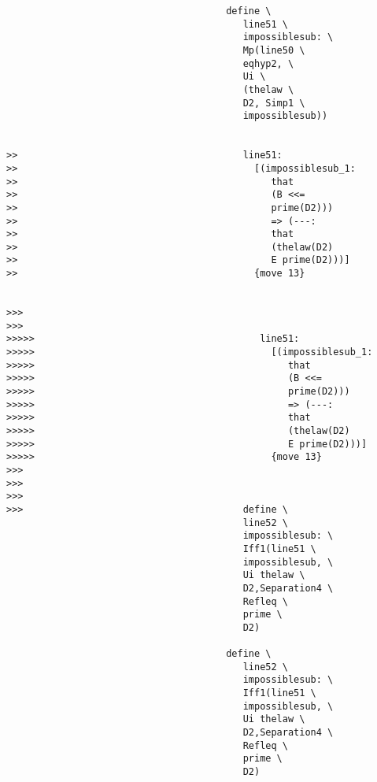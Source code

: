 \documentclass[12pt]{article}
\begin{document}
\begin{verbatim}
                                       define \
                                          line51 \
                                          impossiblesub: \
                                          Mp(line50 \
                                          eqhyp2, \
                                          Ui \
                                          (thelaw \
                                          D2, Simp1 \
                                          impossiblesub))


>>                                        line51:
>>                                          [(impossiblesub_1:
>>                                             that
>>                                             (B <<=
>>                                             prime(D2)))
>>                                             => (---:
>>                                             that
>>                                             (thelaw(D2)
>>                                             E prime(D2)))]
>>                                          {move 13}


>>>
>>>
>>>>>                                        line51:
>>>>>                                          [(impossiblesub_1:
>>>>>                                             that
>>>>>                                             (B <<=
>>>>>                                             prime(D2)))
>>>>>                                             => (---:
>>>>>                                             that
>>>>>                                             (thelaw(D2)
>>>>>                                             E prime(D2)))]
>>>>>                                          {move 13}
>>>
>>>
>>>
>>>                                       define \
                                          line52 \
                                          impossiblesub: \
                                          Iff1(line51 \
                                          impossiblesub, \
                                          Ui thelaw \
                                          D2,Separation4 \
                                          Refleq \
                                          prime \
                                          D2)

                                       define \
                                          line52 \
                                          impossiblesub: \
                                          Iff1(line51 \
                                          impossiblesub, \
                                          Ui thelaw \
                                          D2,Separation4 \
                                          Refleq \
                                          prime \
                                          D2)


\end{verbatim}
\end{document}
